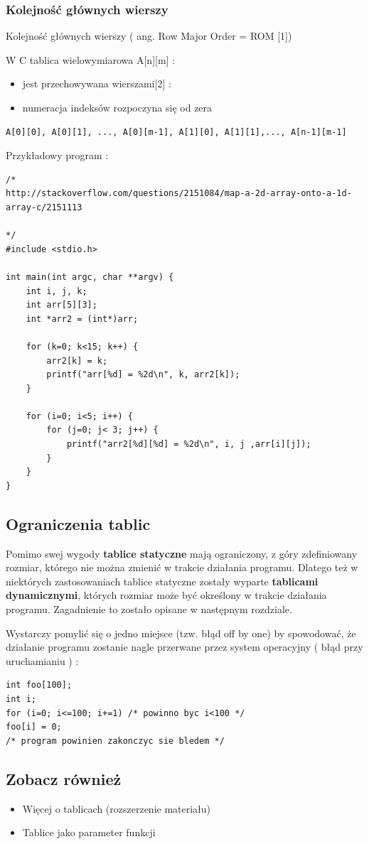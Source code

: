 \documentclass[a4paper,11pt]{article}
\begin{document}
\subsubsection*{Kolejność głównych wierszy} 
Kolejność głównych wierszy ( ang. Row Major Order = ROM [1])

W C tablica wielowymiarowa A[n][m] :
\begin{itemize}
\item jest przechowywana wierszami[2] :
\item numeracja indeksów rozpoczyna się od zera
\end{itemize}
\begin{verbatim}
A[0][0], A[0][1], ..., A[0][m-1], A[1][0], A[1][1],..., A[n-1][m-1] 
\end{verbatim}
Przykładowy program :
\begin{lstlisting}[caption=Tablice wielowymiarowe, captionpos=b,
label=src:passive2,frame=TB,numbers=none]
/*
http://stackoverflow.com/questions/2151084/map-a-2d-array-onto-a-1d-array-c/2151113

*/
#include <stdio.h>

int main(int argc, char **argv) {
	int i, j, k;
	int arr[5][3];
	int *arr2 = (int*)arr;
	
	for (k=0; k<15; k++) {
		arr2[k] = k;
		printf("arr[%d] = %2d\n", k, arr2[k]);
	}
	
	for (i=0; i<5; i++) {
		for (j=0; j< 3; j++) {
			printf("arr2[%d][%d] = %2d\n", i, j ,arr[i][j]);
		}
	} 
}
\end{lstlisting}
\subsection*{Ograniczenia tablic}
Pomimo swej wygody \textbf{tablice statyczne} mają ograniczony, z góry zdefiniowany rozmiar, którego nie można zmienić w trakcie działania programu. Dlatego też w niektórych zastosowaniach tablice statyczne zostały wyparte  \textbf{tablicami dynamicznymi}, których rozmiar może być określony w trakcie działania programu. Zagadnienie to zostało opisane w następnym rozdziale.

\noindent
Wystarczy pomylić się o jedno miejsce (tzw. błąd off by one) by spowodować, że działanie programu zostanie nagle przerwane przez system operacyjny ( błąd przy uruchamianiu ) :
\begin{lstlisting}[caption=Tablice wielowymiarowe, captionpos=b,
label=src:passive2,frame=TB,numbers=none]
int foo[100];
int i;
for (i=0; i<=100; i+=1) /* powinno byc i<100 */
foo[i] = 0;
/* program powinien zakonczyc sie bledem */
\end{lstlisting}
\subsection*{Zobacz również}
\begin{itemize}
	\item Więcej o tablicach (rozszerzenie materiału)
	\item Tablice jako parameter funkcji
\end{itemize}
\end{document}
